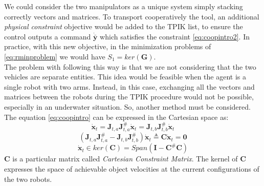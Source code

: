 We could consider the two manipulators as a unique system simply stacking correctly vectors and matrices. To transport cooperatively the tool, an additional \textit{physical constraint} objective would be added to the TPIK list, to ensure the control outputs a command $\dot{\bar{\boldsymbol{y}}}$ which satisfies the constraint \eqref{eq:coopintro2}. In practice, with this new objective, in the minimization problems of \eqref{eq:rminproblem} we would have $S_1 = ker(\boldsymbol{G})$.\\
The problem with following this way is that we are not considering that the two vehicles are separate entities. This idea would be feasible when the agent is a single robot with two arms. Instead, in this case, exchanging all the vectors and matrices between the robots during the TPIK procedure would not be possible, especially in an underwater situation. So, another method must be considered.\\

\noindent The equation \eqref{eq:coopintro} can be expressed in the Cartesian space as:
\begin{equation}
	\dot{\boldsymbol{x}}_t = \boldsymbol{J}_{t,a} \boldsymbol{J}^\#_{t,a} \dot{\boldsymbol{x}}_t =  \boldsymbol{J}_{t,b} \boldsymbol{J}^\#_{t,b} 
	\dot{\boldsymbol{x}}_t 
\end{equation}
\begin{equation}
\label{eq:constrainMatrixC}
	(\boldsymbol{J}_{t,a} \boldsymbol{J}^\#_{t,a} - \boldsymbol{J}_{t,b} \boldsymbol{J}^\#_{t,b}) 
	\dot{\boldsymbol{x}}_t \triangleq \boldsymbol{C} \dot{\boldsymbol{x}}_t = \boldsymbol{0}
\end{equation}
\begin{equation}
	\dot{\boldsymbol{x}}_t \in ker(\boldsymbol{C}) = Span(\boldsymbol{I} - \boldsymbol{C}^\#\boldsymbol{C})
\end{equation}
$\boldsymbol{C}$ is a particular matrix called \textit{Cartesian Constraint Matrix}. The kernel of $\boldsymbol{C}$ expresses the space of achievable object velocities at the current configurations of the two robots.\\


